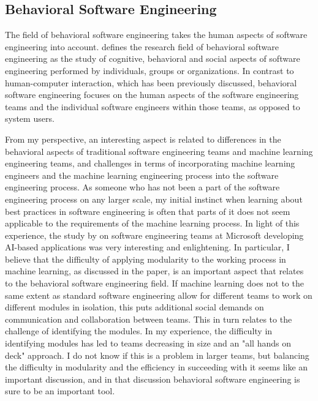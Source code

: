 \documentclass{article}
\begin{document}
\subsection{Behavioral Software Engineering}

The field of behavioral software engineering takes the human aspects of software engineering into account. \citet{behavioralSE} defines the research field of behavioral software engineering as the study of cognitive, behavioral and social aspects of software engineering performed by individuals, groups or organizations. In contrast to human-computer interaction, which has been previously discussed, behavioral software engineering focuses on the human aspects of the software engineering teams and the individual software engineers within those teams, as opposed to system users. 

From my perspective, an interesting aspect is related to differences in the behavioral aspects of traditional software engineering teams and machine learning engineering teams, and challenges in terms of incorporating machine learning engineers and the machine learning engineering process into the software engineering process. As someone who has not been a part of the software engineering process on any larger scale, my initial instinct when learning about best practices in software engineering is often that parts of it does not seem applicable to the requirements of the machine learning process. In light of this experience, the study by \citet{microsoft} on software engineering teams at Microsoft developing AI-based applications was very interesting and enlightening. In particular, I believe that the difficulty of applying modularity to the working process in machine learning, as discussed in the paper, is an important aspect that relates to the behavioral software engineering field. If machine learning does not to the same extent as standard software engineering allow for different teams to work on different modules in isolation, this puts additional social demands on communication and collaboration between teams. This in turn relates to the challenge of identifying the modules. In my experience, the difficulty in identifying modules has led to teams decreasing in size and an "all hands on deck" approach. I do not know if this is a problem in larger teams, but balancing the difficulty in modularity and the efficiency in succeeding with it seems like an important discussion, and in that discussion behavioral software engineering is sure to be an important tool. 
\end{document}
